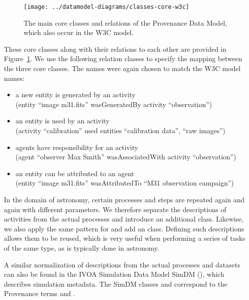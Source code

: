 \noindent



\begin{figure}[h]
\centering
\texttt{[image: ../datamodel-diagrams/classes-core-w3c]}
\caption{The main core classes and relations of the Provenance Data Model, which also occur in the W3C model.}
\label{fig:coreclasses}
\end{figure}

These core classes along with their relations to each other are provided in Figure~\ref{fig:coreclasses}.
We use the following relation classes to specify the mapping between the three core 
classes. The names were again chosen to match the W3C model names:
\begin{itemize}
\item {} a new entity is generated by an activity\\
        (entity ``image m31.fits'' wasGeneratedBy activity ``observation'')
\item {} an entity is used by an activity\\
        (activity ``calibration'' used entities ``calibration data'', ``raw images'')
\item {} agents have responsibility for an activity\\
        (agent ``observer Max Smith'' wasAssociatedWith activity ``observation'')
\item {} an entity can be attributed to an agent\\
		(entity ``image m31.fits'' wasAttributedTo ``M31 observation campaign'')
\end{itemize}


In the domain of astronomy, certain processes and steps are repeated again and 
again with different parameters. We therefore separate the descriptions of activities
from the actual processes and introduce an additional  class.
Likewise, we also apply the same pattern for  and add an 
class.
Defining such descriptions allows them to be reused, which is very useful 
when performing a series of tasks of the same type, as is typically done in 
astronomy. 

A similar normalization of descriptions from the actual processes and datasets 
can also be found in the IVOA Simulation Data Model SimDM (\cite{std:SimDM}), 
which describes simulation metadata. The SimDM classes  and  
correspond to the Provenance terms  and .

